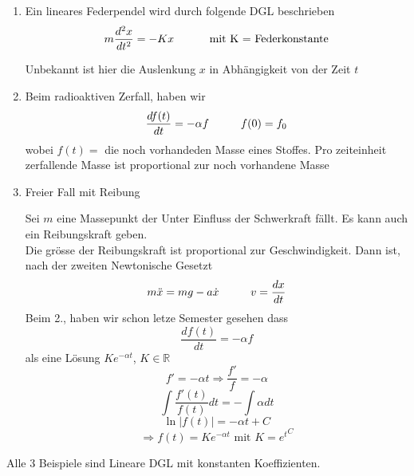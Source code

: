 \begin{enumerate}
\item Ein lineares Federpendel wird durch folgende DGL beschrieben $$m\frac{d^2x}{dt^2}=-Kx\text{\hspace{10mm} mit K = Federkonstante}$$
\begin{center}
\end{center}
Unbekannt ist hier die Auslenkung $x$ in Abhängigkeit von der Zeit $t$
\item Beim radioaktiven Zerfall, haben wir $$\frac{df(t)}{dt}=-\alpha f\text{\hspace{10mm}}f(0)=f_0$$
wobei $f(t)=$ die noch vorhandeden Masse eines Stoffes. Pro zeiteinheit zerfallende Masse ist proportional zur noch vorhandene Masse
\item Freier Fall mit Reibung
\begin{center}
\end{center}
Sei $m$ eine Massepunkt der Unter Einfluss der Schwerkraft fällt. Es kann auch ein Reibungskraft geben. \\

Die grösse der Reibungskraft ist proportional zur Geschwindigkeit. Dann ist, nach der zweiten Newtonische Gesetzt \[m\ddot x = mg - a\dot x\text{\hspace{10mm}}v=\frac{dx}{dt}\]
Beim 2., haben wir schon letze Semester gesehen dass $$\frac{df(t)}{dt}=-\alpha f$$ als eine Lösung $Ke^{-\alpha t}$, $K\in\mathbb{R}$
$$f'=-\alpha t\Rightarrow \frac{f'}{f}=-\alpha$$
$$\int{\frac{f'(t)}{f(t)}dt}=-\int{\alpha dt}$$
$$\ln\left| f(t)\right|=-\alpha t+C$$
$$\Rightarrow f(t)=Ke^{-\alpha t}\text{ mit }K={e^{t}}^C$$
\end{enumerate}
Alle 3 Beispiele sind Lineare DGL mit konstanten Koeffizienten. 

